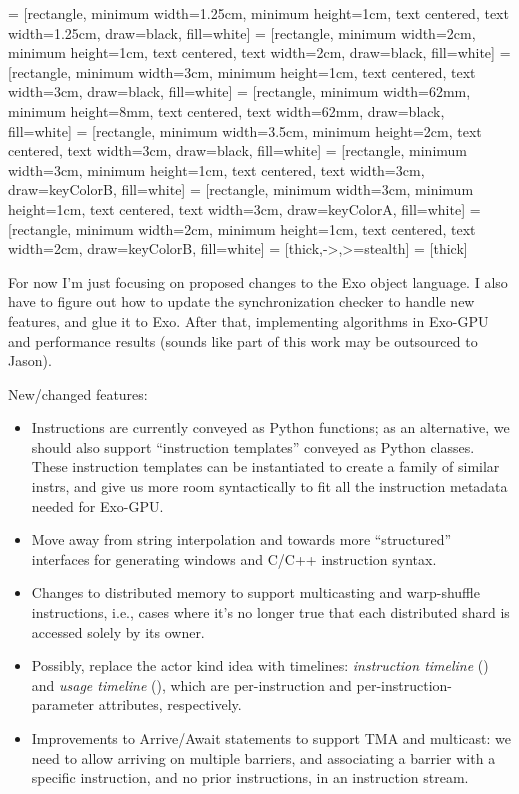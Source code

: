 

 = [rectangle, minimum width=1.25cm, minimum height=1cm, text centered, text width=1.25cm, draw=black, fill=white]
 = [rectangle, minimum width=2cm, minimum height=1cm, text centered, text width=2cm, draw=black, fill=white]
 = [rectangle, minimum width=3cm, minimum height=1cm, text centered, text width=3cm, draw=black, fill=white]
 = [rectangle, minimum width=62mm, minimum height=8mm, text centered, text width=62mm, draw=black, fill=white]
 = [rectangle, minimum width=3.5cm, minimum height=2cm, text centered, text width=3cm, draw=black, fill=white]
 = [rectangle, minimum width=3cm, minimum height=1cm, text centered, text width=3cm, draw=keyColorB, fill=white]
 = [rectangle, minimum width=3cm, minimum height=1cm, text centered, text width=3cm, draw=keyColorA, fill=white]
 = [rectangle, minimum width=2cm, minimum height=1cm, text centered, text width=2cm, draw=keyColorB, fill=white]
 = [thick,->,>=stealth]
 = [thick]



For now I'm just focusing on proposed changes to the Exo object language.
I also have to figure out how to update the synchronization checker to handle new features, and glue it to Exo.
After that, implementing algorithms in Exo-GPU and performance results (sounds like part of this work may be outsourced to Jason).

New/changed features:

\begin{itemize}
\item Instructions are currently conveyed as Python functions; as an alternative, we should also support ``instruction templates'' conveyed as Python classes.
These instruction templates can be instantiated to create a family of similar instrs, and give us more room syntactically to fit all the instruction metadata needed for Exo-GPU.
\item Move away from string interpolation and towards more ``structured'' interfaces for generating windows and C/C++ instruction syntax.
\item Changes to distributed memory to support multicasting and warp-shuffle instructions, i.e., cases where it's no longer true that each distributed shard is accessed solely by its owner.
\item Possibly, replace the actor kind idea with timelines: \textit{instruction timeline} () and \textit{usage timeline} (), which are per-instruction and per-instruction-parameter attributes, respectively.
\item Improvements to Arrive/Await statements to support TMA and multicast: we need to allow arriving on multiple barriers, and associating a barrier with a specific instruction, and no prior instructions, in an instruction stream.
\end{itemize}


